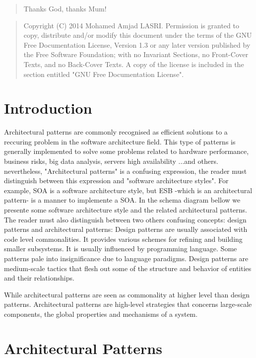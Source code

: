 \renewcommand{\abstractname}{Acknowledgements}
\begin{abstract}
 Thanks God, thanks Mum!
\end{abstract}

\renewcommand{\abstractname}{License}
\begin{abstract}
    Copyright (C)  2014  Mohamed Amjad LASRI.
    Permission is granted to copy, distribute and/or modify this document
    under the terms of the GNU Free Documentation License, Version 1.3
    or any later version published by the Free Software Foundation;
    with no Invariant Sections, no Front-Cover Texts, and no Back-Cover Texts.
    A copy of the license is included in the section entitled "GNU
    Free Documentation License".
\end{abstract}


\section{Introduction}

Architectural patterns are commonly recognised as efficient solutions to a reccuring problem in the software architecture field. This type of patterns is generally implemented to solve some problems related to hardware performance, business risks, big data analysis, servers high availability ...and others.
nevertheless, "Architectural patterns" is a confusing expression, the reader must distinguish between this expression and "software architecture styles". For example, SOA is a software architecture style, but ESB -which is an architectural pattern- is a manner to implemente a SOA.
In the schema diagram bellow we presente some software architecture style and the related architectural patterns.
The reader must also distinguish between two others confusing concepts: design patterns and architectural patterns:
 Design patterns are usually associated with code level commonalities. It provides various schemes for refining and building smaller subsystems. It is usually influenced by programming language. Some patterns pale into insignificance due to language paradigms. Design patterns are medium-scale tactics that flesh out some of the structure and behavior of entities and their relationships.

While architectural patterns are seen as commonality at higher level than design patterns. Architectural patterns are high-level strategies that concerns large-scale components, the global properties and mechanisms of a system.

\section{Architectural Patterns}
\label{sec:ArchitecturalPatterns}

